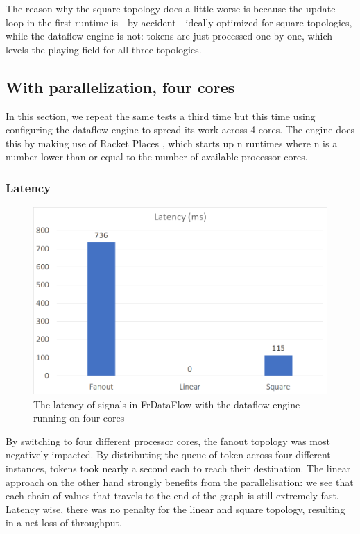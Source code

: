 The reason why the square topology does a little worse is because the update loop in the first runtime is - by accident - ideally optimized for square topologies, while the dataflow engine is not: tokens are just processed one by one, which levels the playing field for all three topologies. 

\subsection{With parallelization, four cores}

In this section, we repeat the same tests a third time but this time using configuring the dataflow engine to spread its work across 4 cores. The engine does this by making use of Racket Places \cite{tew_places:_2011}, which starts up n runtimes where n is a number lower than or equal to the number of available processor cores. 

\subsubsection{Latency}

\begin{figure}[h]
	\includegraphics[width=\textwidth]{images/Evaluation-WithDataFlowParallel-Latency.png}
	\caption{The latency of signals in FrDataFlow with the dataflow engine running on four cores}
	\label{fig:evaluation-withdataflow-latency}
\end{figure}

By switching to four different processor cores, the fanout topology was most negatively impacted. By distributing the queue of token across four different instances, tokens took nearly a second each to reach their destination. 
The linear approach on the other hand strongly benefits from the parallelisation: we see that each chain of values that travels to the end of the graph is still extremely fast. Latency wise, there was no penalty for the linear and square topology, resulting in a net loss of throughput.

